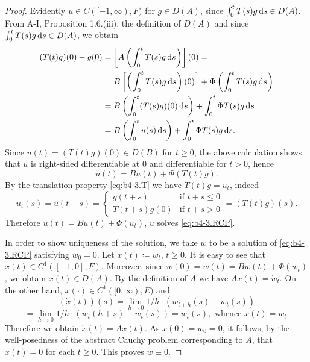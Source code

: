 \begin{proof} Evidently $u \in C([-1,\infty),F)$ for $g \in D(A)$,
since $\int_{0}^{t} T(s)g \mathop{}\!\mathrm{d}{s}  \in D(A)$.
From A-I, Proposition 1.6.(iii), the definition of $D(A)$ and since $\int_{0}^{t} T(s)g \mathop{}\!\mathrm{d}{s}  \in D(A)$, we obtain
\begin{align*}
	(T(t)g)(0) - g(0) &= \left[A\left(\int_{0}^{t} T(s)g  \mathop{}\!\mathrm{d}{s} \right)\right](0) = \\
	&= B\left[\left(\int_{0}^{t} T(s)g \mathop{}\!\mathrm{d}{s}\right)(0)\right] + \Phi\left(\int_{0}^{t} T(s)g \mathop{}\!\mathrm{d}{s} \right) \\
	&= B\left(\int_{0}^{t} (T(s)g)(0) \mathop{}\!\mathrm{d}{s}\right) + \int_{0}^{t} \Phi T(s)g \mathop{}\!\mathrm{d}{s}  \\
	&= B\left(\int_{0}^{t} u(s) \mathop{}\!\mathrm{d}{s}\right)  + \int_{0}^{t} \Phi T(s)g \mathop{}\!\mathrm{d}{s} .
\end{align*}
Since $u(t) = (T(t)g)(0) \in D(B)$ for $t \geq 0$, the above calculation shows that $u$ is right-sided differentiable at $0$ and differentiable for $t > 0$, hence
\[
\dot{u}(t) = Bu(t) + \Phi(T(t)g) .
\]
By the translation property \eqref{eq:b4-3.T} we have $T(t)g = u_t$, indeed
\[
u_t(s) = u(t+s) = 
\begin{cases}
	g(t+s) & \text{if } t+s \leq 0 \\
	T(t+s)g(0) & \text{if } t+s > 0
\end{cases}
= (T(t)g)(s) .
\]
Therefore $\dot{u}(t) = Bu(t) + \Phi(u_t)$, \ie $u$ solves \eqref{eq:b4-3.RCP}.

In order to show uniqueness of the solution, we take $w$ to be a solution of \eqref{eq:b4-3.RCP} satisfying $w_{0} = 0$. 
Let $x(t) \coloneq  w_t$, $t \geq 0$. 
It is easy to see that $x(t) \in C^1([-1,0],F)$. Moreover, since $\dot{w}(0) = \dot{w}(t) = Bw(t) + \Phi(w_t)$, we obtain $x(t) \in D(A)$. 
By the definition of $A$ we have $Ax(t) = \dot{w}_t$. 
On the other hand, $x(\cdot) \in C^1([0,\infty),E)$ and
\[
(\dot{x}(t))(s) = \lim_{h \to 0} 1/h \cdot (w_{t+h}(s) - w_t(s))
\]
\[
= \lim_{h \to 0} 1/h \cdot (w_t(h+s) - w_t(s)) = \dot{w}_t(s), \text{ whence } \dot{x}(t) = \dot{w}_t .
\]
Therefore we obtain $\dot{x}(t) = Ax(t)$. 
As $x(0) = w_{0} = 0$, it follows, by the well-posedness of the abstract Cauchy problem corresponding to $A$,  that $x(t) = 0$ for each $t \geq 0$. 
This proves $w \equiv 0$.
\end{proof}
